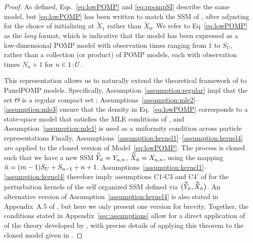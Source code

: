 \documentclass[12pt]{article}\usepackage[]{graphicx}\usepackage[]{xcolor}
\begin{document}
\begin{appendices}
\begin{proof}
  As defined, Eqs.~\ref{eq:lowPOMP} and \ref{eq:ppompSI} describe the same model, but \ref{eq:lowPOMP} has been written to match the SSM of \citet{chen25}, after adjusting for the choice of initializing at $\tilde{X}_1$ rather than $\tilde{X}_0$.
  We refer to Eq~\ref{eq:lowPOMP} as the \emph{long} format, which is indicative that the model has been expressed as a low-dimensional POMP model with observation times ranging from $1$ to $S_U$, rather than a collection (or product) of POMP models, each with observation times $N_u+1$ for $u \in {1}\!:\!{U}$.

  This representation allows us to naturally extend the theoretical framework of \citet{chen25} to PanelPOMP models.
  Specifically, Assumption~\ref{assumption:regular} impl that the set $\Theta$ is a regular compact set \citep[See Definition~1 of][]{chen25}; Assumptions~\ref{assumption:mle2}--\ref{assumption:mle3} ensure that the density in Eq.~\ref{eq:lowPOMP} corresponds to a state-space model that satisfies the MLE conditions of \citet{chen25}, and Assumption~\ref{assumption:mle1} is used as a uniformity condition across particle representations
  Finally, Assumptions~\ref{assumption:kernel1}--\ref{assumption:kernel4} are applied to the cloned version of Model~\ref{eq:lowPOMP}.
  The process is cloned such that we have a new SSM $\accentset{\approx}{Y}_{\tilde{n}} = Y_{u, n}$, $\accentset{\approx}{X}_{\tilde{n}} = X_{u, n}$, using the mapping $\tilde{n} = (m-1)S_U + S_{u-1}+n+1$.
  Assumptions~\ref{assumption:kernel1}--\ref{assumption:kernel4} therefore imply assumptions C1-C3 and C4' of \citet{chen25} for the perturbation kernels of the self organized SSM defined via $\big(\accentset{\approx}{Y}_{\tilde{n}}, \accentset{\approx}{X}_{\tilde{n}}\big)$.
  An alternative version of Assumption~\ref{assumption:kernel4} is also stated in Appendix~A.5 of \citet{chen25}, but here we only present one version for brevity.
  Together, the conditions stated in Appendix~\ref{sec:assumptions} allow for a direct application of of the theory developed by \citet[][Appendix~A]{chen25}, with precise details of applying this theorem to the cloned model given in \citet[Supplement~S7,][]{chen25}.
    \end{proof}

  \noindent {}


\end{appendices}
\end{document}
